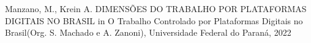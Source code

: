 \documentclass[
12pt,		%
openright,	%
twoside,  %
a4paper,			%
chapter=TITLE,		%
english,			%
french,				%
spanish,			%
brazil				%
]{USPSC-classe/USPSC}
\begin{document}
\begin{flushleft}
\begin{flushleft}
\begin{flushleft}
\begin{flushleft}
\begin{flushleft}
\begin{flushleft}
\begin{flushleft}
\begin{flushleft}
\begin{flushleft}
\begin{flushleft}
 Manzano, M., Krein A. DIMENS\~OES DO TRABALHO POR PLATAFORMAS DIGITAIS NO BRASIL in \textquotedbl O Trabalho Controlado por Plataformas Digitais no Brasil\textquotedbl  (Org. S. Machado e A. Zanoni), Universidade Federal do Paran\'a, 2022
\end{flushleft}


\end{flushleft}


\end{flushleft}


\end{flushleft}


\end{flushleft}


\end{flushleft}


\end{flushleft}


\end{flushleft}


\end{flushleft}


\end{flushleft}
\end{document}
